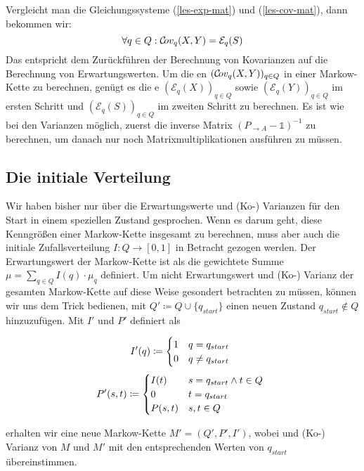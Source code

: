 \documentclass[a4paper]{article}
\newcommand{\mc}{Markow-Kette}
\theoremstyle{nonumberplain}
\begin{document}
 Vergleicht man die Gleichungssysteme (\ref{les-exp-mat}) und (\ref{les-cov-mat}), dann bekommen wir:
\begin{equation}
\forall q \in Q : \mathcal{C}\!ov_q(X,Y) = \mathcal{E}_q(S)
\end{equation}
Das entspricht dem Zurückführen der Berechnung von Kovarianzen auf die Berechnung von Erwartungswerten. Um die \cov{}en $(\mathcal{C}\!ov_q(X,Y))_{q\in Q}$ in einer \mc{} zu berechnen, genügt es die \expect{}e $(\mathcal{E}_q(X))_{q\in Q}$ sowie $(\mathcal{E}_q(Y))_{q\in Q}$ im ersten Schritt und $(\mathcal{E}_q(S))_{q\in Q}$ im zweiten Schritt zu berechnen. Es ist wie bei den Varianzen möglich, zuerst die inverse Matrix $(P_{\rightarrow A} - \mathbb{1})^{-1}$ zu berechnen, um danach nur noch Matrixmultiplikationen ausführen zu müssen.

\subsection{Die initiale Verteilung}

Wir haben bisher nur über die Erwartungswerte und (Ko-) Varianzen für den Start in einem speziellen Zustand gesprochen. Wenn es darum geht, diese Kenngrößen einer \mc{} \mcex{} insgesamt zu berechnen, muss aber auch die initiale Zufallsverteilung $I : Q \to [0,1]$ in Betracht gezogen werden. Der Erwartungswert der \mc{} ist als die gewichtete Summe $\mu = \sum_{q\in Q}{I(q) \cdot \mu_q}$ definiert. Um nicht Erwartungswert und (Ko-) Varianz der gesamten \mc{} auf diese Weise gesondert betrachten zu müssen, können wir uns dem Trick bedienen, mit $Q' \coloneqq Q \cup \{q_{start}\}$ einen neuen Zustand $q_{start} \notin Q$ hinzuzufügen. Mit $I'$ und $P'$ definiert als
\begin{multicols}{2}
\noindent
\begin{equation*}
	\hspace{-1ex}I'(q) \coloneqq \begin{cases}
		1 & q = q_{start}\\
		0 & q \neq q_{start}
		
	\end{cases}
\end{equation*}
\begin{equation*}
	\hspace{-1ex}P'(s, t)  \coloneqq \begin{cases}
	I(t) & s = q_{start} \land t \in Q \\
	0 & t = q_{start}\\
	P(s,t) & s,t \in Q
	\end{cases}
\end{equation*}
\end{multicols}
erhalten wir eine neue \mc{} $M'=(Q',P',I')$, wobei \expect{} und (Ko-) Varianz von $M$ und $M'$ mit den entsprechenden Werten von $q_{start}$ übereinstimmen.
\end{document}
